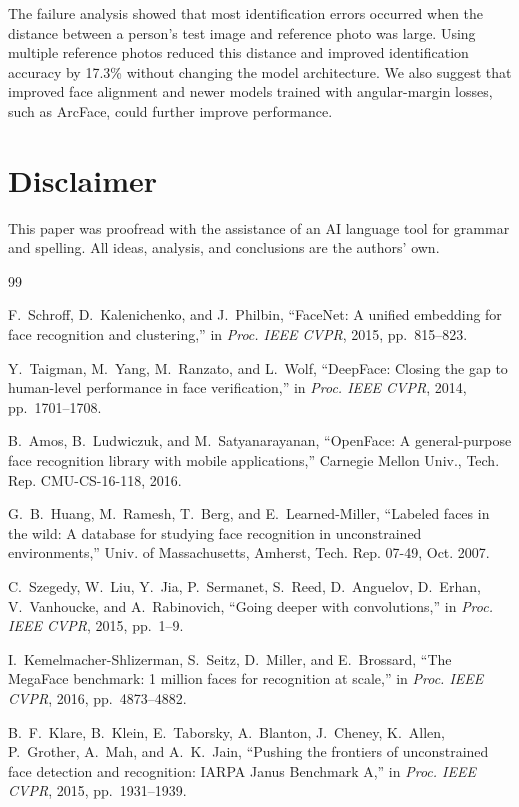 \documentclass[conference]{IEEEtran}
\begin{document}
The failure analysis showed that most identification errors occurred when the distance between a person's test image and reference photo was large. Using multiple reference photos reduced this distance and improved identification accuracy by 17.3\% without changing the model architecture. We also suggest that improved face alignment and newer models trained with angular-margin losses, such as ArcFace, could further improve performance.

\section{Disclaimer}
This paper was proofread with the assistance of an AI language tool for grammar and spelling. All ideas, analysis, and conclusions are the authors' own.

\balance
\begin{thebibliography}{99}

F.~Schroff, D.~Kalenichenko, and J.~Philbin, ``FaceNet: A unified embedding for
face recognition and clustering,'' in \emph{Proc. IEEE CVPR}, 2015, pp.\ 815--823.

Y.~Taigman, M.~Yang, M.~Ranzato, and L.~Wolf, ``DeepFace: Closing the gap to
human-level performance in face verification,'' in \emph{Proc. IEEE CVPR}, 2014,
pp.\ 1701--1708.

B.~Amos, B.~Ludwiczuk, and M.~Satyanarayanan, ``OpenFace: A general-purpose face
recognition library with mobile applications,'' Carnegie Mellon Univ.,
Tech. Rep. CMU-CS-16-118, 2016.

G.~B.~Huang, M.~Ramesh, T.~Berg, and E.~Learned-Miller, ``Labeled faces in the
wild: A database for studying face recognition in unconstrained environments,''
Univ. of Massachusetts, Amherst, Tech. Rep. 07-49, Oct. 2007.

C.~Szegedy, W.~Liu, Y.~Jia, P.~Sermanet, S.~Reed, D.~Anguelov, D.~Erhan,
V.~Vanhoucke, and A.~Rabinovich, ``Going deeper with convolutions,'' in
\emph{Proc. IEEE CVPR}, 2015, pp.\ 1--9.

I.~Kemelmacher-Shlizerman, S.~Seitz, D.~Miller, and E.~Brossard, ``The MegaFace
benchmark: 1 million faces for recognition at scale,'' in \emph{Proc. IEEE CVPR},
2016, pp.\ 4873--4882.

B.~F.~Klare, B.~Klein, E.~Taborsky, A.~Blanton, J.~Cheney, K.~Allen, P.~Grother,
A.~Mah, and A.~K.~Jain, ``Pushing the frontiers of unconstrained face detection and
recognition: IARPA Janus Benchmark A,'' in \emph{Proc. IEEE CVPR}, 2015,
pp.\ 1931--1939.


\end{thebibliography}
\end{document}
